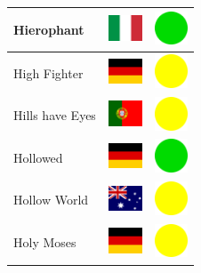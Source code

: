 \documentclass[12pt, a4paper, twoside]{report}
\begin{document}
\begin{center}
\begin{longtable}{|p{5cm}|p{2cm}|p{2cm}|}
 Hierophant                                                 & \includegraphics[width=1cm]{../4x3/it} &   \includegraphics[width=1cm]{../likes/y} \\ \hline
 High Fighter                                               & \includegraphics[width=1cm]{../4x3/de} &   \includegraphics[width=1cm]{../likes/m} \\ \hline
 Hills have Eyes                                            & \includegraphics[width=1cm]{../4x3/pt} &   \includegraphics[width=1cm]{../likes/m} \\ \hline
 Hollowed                                                   & \includegraphics[width=1cm]{../4x3/de} &   \includegraphics[width=1cm]{../likes/y} \\ \hline
 Hollow World                                               & \includegraphics[width=1cm]{../4x3/au} &   \includegraphics[width=1cm]{../likes/m} \\ \hline
 Holy Moses                                                 & \includegraphics[width=1cm]{../4x3/de} &   \includegraphics[width=1cm]{../likes/m} \\ \hline

\end{longtable}
\end{center}
\end{document}
